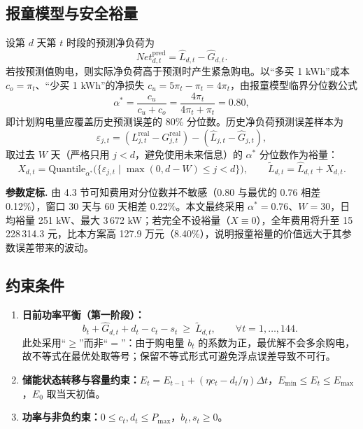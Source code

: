 \documentclass{cumcmthesis}
\begin{document}
\subsection{报童模型与安全裕量}
设第 $d$ 天第 $t$ 时段的预测净负荷为
\begin{equation}
    Net^{\mathrm{pred}}_{d,t}=\hat L_{d,t}-\hat G_{d,t}.
\end{equation}
若按预测值购电，则实际净负荷高于预测时产生紧急购电。以“多买 1 kWh”成本 $c_o=\pi_t$、“少买 1 kWh”的净损失 $c_u=5\pi_t-\pi_t=4\pi_t$，由报童模型临界分位数公式
\begin{equation}
    \alpha^{*}=\frac{c_u}{c_u+c_o}=\frac{4\pi_t}{4\pi_t+\pi_t}=0.80,
\end{equation}
即计划购电量应覆盖历史预测误差的 80\% 分位数。历史净负荷预测误差样本为
\begin{equation}
    \varepsilon_{j,t}=(L^{\mathrm{real}}_{j,t}-G^{\mathrm{real}}_{j,t})-(\hat L_{j,t}-\hat G_{j,t}),
\end{equation}
取过去 $W$ 天（严格只用 $j<d$，避免使用未来信息）的 $\alpha^{*}$ 分位数作为裕量：
\begin{equation}
    X_{d,t}=\mathrm{Quantile}_{\alpha^{*}}\bigl(\{\varepsilon_{j,t}\mid \max(0,d-W)\le j<d\}\bigr),
    \qquad
    \tilde L_{d,t}=\hat L_{d,t}+X_{d,t}.
\end{equation}

\textbf{参数定标.} 由 4.3 节可知费用对分位数并不敏感（$0.80$ 与最优的 $0.76$ 相差 0.12\%），窗口 30 天与 60 天相差 0.22\%。本文最终采用 $\alpha^{*}=0.76$、$W=30$，日均裕量 251 kW、最大 3\,672 kW；若完全不设裕量（$X\equiv0$），全年费用将升至 15\,228\,314.3 元，比本方案高 127.9 万元（8.40\%），说明报童裕量的价值远大于其参数误差带来的波动。

\subsection{约束条件}
\begin{enumerate}
    \item \textbf{日前功率平衡（第一阶段）：}
    \begin{equation}
        b_t+\hat G_{d,t}+d_t-c_t-s_t\ \ge\ \tilde L_{d,t},\qquad \forall t=1,\dots,144 .
    \end{equation}
    此处采用“$\ge$”而非“$=$”：由于购电量 $b_t$ 的系数为正，最优解不会多余购电，故不等式在最优处取等号；保留不等式形式可避免浮点误差导致不可行。
    \item \textbf{储能状态转移与容量约束：}$E_t=E_{t-1}+(\eta c_t-d_t/\eta)\Delta t$，$E_{\min}\le E_t\le E_{\max}$，$E_0$ 取当天初值。
    \item \textbf{功率与非负约束：}$0\le c_t,d_t\le P_{\max}$，$b_t,s_t\ge0$。
\end{enumerate}
\end{document}
